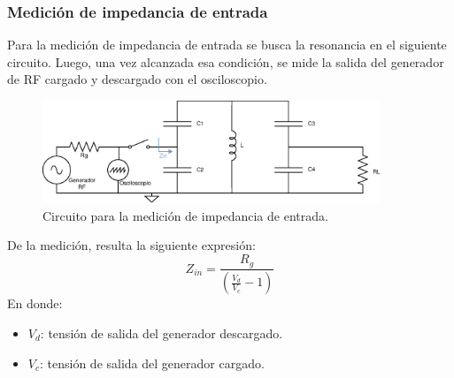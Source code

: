 \documentclass{article}
\begin{document}
\subsubsection{Medición de impedancia de entrada}
Para la medición de impedancia de entrada se busca la resonancia en el siguiente circuito. Luego, una vez alcanzada esa condición, se mide la salida del generador de RF cargado y descargado con el osciloscopio. 
\begin{figure}[H]
\centering
\includegraphics[width=0.9\textwidth]{./img/figura25.eps}
\caption{Circuito para la medición de impedancia de entrada.}
\label{fig:circuito25}
\end{figure}
\noindent De la medición, resulta la siguiente expresión:
\begin{equation*}
    Z_{in} = \frac{R_g}{\left( \frac{V_d}{V_c} - 1 \right)}
\end{equation*}
\noindent En donde:
\begin{itemize}
    \item $V_d$: tensión de salida del generador descargado.
    \item $V_c$: tensión de salida del generador cargado.
\end{itemize}
\end{document}
